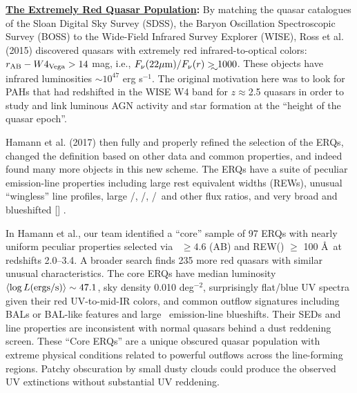 \medskip
\medskip

\smallskip
\smallskip
\noindent
{\bf \underline{The Extremely Red Quasar Population}:}
By matching the quasar catalogues of the Sloan Digital Sky Survey
(SDSS), the Baryon Oscillation Spectroscopic Survey (BOSS) to the
Wide-Field Infrared Survey Explorer (WISE), Ross et al. (2015)
discovered quasars with extremely red infrared-to-optical colors:
$r_{\rm AB}-W4_{\rm Vega}>14$ mag, i.e., $F_\nu({\rm 22\mu
m})/F_\nu(r) \gtrsim 1000$.  These objects have infrared luminosities
$\sim 10^{47}$ erg s$^{-1}$.  The original motivation here was to look
for PAHs that had redshifted in the WISE W4 band for $z\approx$2.5
quasars in order to study and link luminous AGN activity and star
formation at the ``height of the quasar epoch''.

Hamann et al. (2017) then fully and properly refined the selection of
the ERQs, changed the definition based on other data and common
properties, and indeed found many more objects in this new scheme. The
ERQs have a suite of peculiar emission-line properties including large
rest equivalent widths (REWs), unusual ``wingless'' line profiles,
large \nv /\lya , \nv /\civ , \siiv /\civ\ and other flux ratios, and
very broad and blueshifted [\oiii ] .

In Hamann et al., our team identified a ``core'' sample of 97 ERQs
with nearly uniform peculiar properties selected via \imw\ $\ge 4.6$
(AB) and REW(\civ ) $\ge$ 100 \AA\ at redshifts 2.0--3.4. A broader
search finds 235 more red quasars with similar unusual
characteristics. The core ERQs have median luminosity $\left<\log L
({\rm ergs/s})\right> \sim 47.1$, sky density 0.010 deg$^{-2}$,
surprisingly flat/blue UV spectra given their red UV-to-mid-IR colors,
and common outflow signatures including BALs or BAL-like features and
large \civ\ emission-line blueshifts. Their SEDs and line properties
are inconsistent with normal quasars behind a dust reddening
screen. These ``Core ERQs'' are a unique obscured quasar population
with extreme physical conditions related to powerful outflows across
the line-forming regions. Patchy obscuration by small dusty clouds
could produce the observed UV extinctions without substantial UV
reddening.


